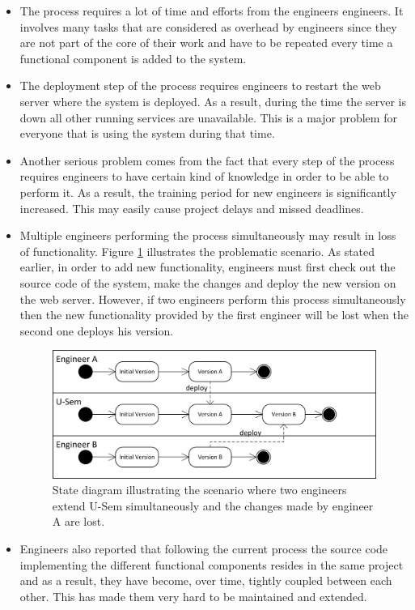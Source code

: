 \begin{itemize}

	\item The process requires a lot of time and efforts from the engineers engineers. It involves many tasks that are considered as overhead by engineers since they are not part of the core of their work and have to be repeated every time a functional component is added to the system.
	
	\item The deployment step of the process requires engineers to restart the web server where the system is deployed. As a result, during the time the server is down all other running services are unavailable. This is a major problem for everyone that is using the system during that time.
	
	\item Another serious problem comes from the fact that every step of the process requires engineers to have certain kind of knowledge in order to be able to perform it. As a result, the training period for new engineers is significantly increased. This may easily cause project delays and missed deadlines.
	
	\item Multiple engineers performing the process simultaneously may result in loss of functionality. Figure \ref{fig_vers_prob} illustrates the problematic scenario. As stated earlier, in order to add new functionality, engineers must first check out the source code of the system, make the changes and deploy the new version on the web server. However, if two engineers perform this process simultaneously then the new functionality provided by the first engineer will be lost when the second one deploys his version. 
	
	\begin{figure}[h!]
  \centering
  	\includegraphics[scale=0.75]{plug-in/version_problem.png}
  \caption{State diagram illustrating the scenario where two engineers extend U-Sem simultaneously and the changes made by engineer A are lost.  }
  \label{fig_vers_prob}
\end{figure}
	
	\item Engineers also reported that following the current process the source code implementing the different functional components resides in the same project and as a result, they have become, over time, tightly coupled between each other. This has made them very hard to be maintained and extended.
		
\end{itemize}

